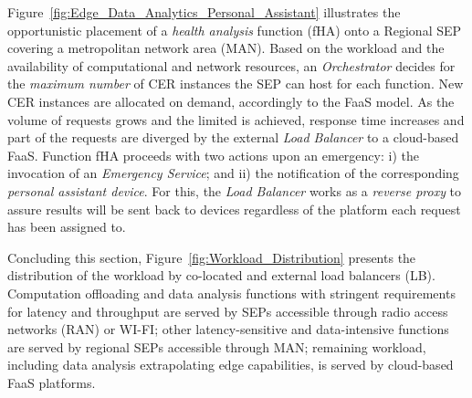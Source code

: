 Figure~\ref{fig:Edge_Data_Analytics_Personal_Assistant} illustrates the opportunistic placement of a \textit{health analysis} function (fHA) onto a Regional SEP covering a metropolitan network area (MAN). Based on the workload and the availability of computational and network resources, an \textit{Orchestrator} decides for the \textit{maximum number} of CER instances the SEP can host for each function.
New CER instances are allocated on demand, accordingly to the FaaS model. As the volume of requests grows and the limited is achieved, response time increases and part of the requests are diverged
by the external \textit{Load Balancer} to a cloud-based FaaS.
%
Function fHA proceeds with two actions upon an emergency: i) the invocation of an 
\textit{Emergency Service}; and ii) the notification of the corresponding \textit{personal assistant device}. For this, the \textit{Load Balancer} works as a \textit{reverse proxy} to assure results will be sent back to devices regardless of the platform each request has been assigned to.

Concluding this section, 
Figure~\ref{fig:Workload_Distribution} presents the distribution of the workload by co-located and external load balancers (LB). Computation offloading and data analysis functions with stringent requirements for latency and throughput are served by SEPs accessible through radio access networks (RAN) or WI-FI;
other latency-sensitive and data-intensive functions are served by regional SEPs accessible through MAN; 
remaining workload, including data analysis extrapolating edge capabilities, is served by cloud-based FaaS platforms. 








